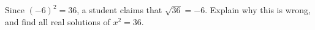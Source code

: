 Since $(-6)^2=36$, a student claims that $\sqrt{36}=-6$. Explain why this is wrong, and find all real solutions of $x^2=36$.
